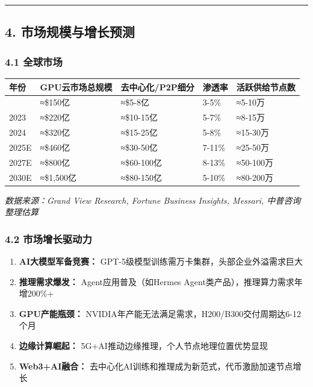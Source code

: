 \documentclass[UTF8,a4paper,12pt]{ctexart}
\begin{document}
\begin{center}\rule{0.5\linewidth}{0.5pt}\end{center}

\pagebreak

\subsection{4.
市场规模与增长预测}\label{ux5e02ux573aux89c4ux6a21ux4e0eux589eux957fux9884ux6d4b}

\subsubsection{4.1 全球市场}\label{ux5168ux7403ux5e02ux573a}

{\def\LTcaptype{none} %
\begin{longtable}[]{@{}lllll@{}}
\toprule\noalign{}
年份 & GPU云市场总规模 & 去中心化/P2P细分 & 渗透率 & 活跃供给节点数 \\
\midrule\noalign{}
\endhead
\bottomrule\noalign{}
\endlastfoot
2022 & ≈\$150亿 & ≈\$5-8亿 & 3-5\% & ≈5-10万 \\
2023 & ≈\$220亿 & ≈\$10-15亿 & 5-7\% & ≈8-15万 \\
2024 & ≈\$320亿 & ≈\$15-25亿 & 5-8\% & ≈15-30万 \\
2025E & ≈\$460亿 & ≈\$30-50亿 & 7-11\% & ≈25-50万 \\
2027E & ≈\$800亿 & ≈\$60-100亿 & 8-13\% & ≈50-100万 \\
2030E & ≈\$1,500亿 & ≈\$80-150亿 & 5-10\% & ≈80-200万 \\
\end{longtable}
}

\emph{数据来源：Grand View Research, Fortune Business Insights, Messari,
中普咨询整理估算}

\subsubsection{4.2
市场增长驱动力}\label{ux5e02ux573aux589eux957fux9a71ux52a8ux529b}

\begin{enumerate}
\def\labelenumi{\arabic{enumi}.}
\tightlist
\item
  \textbf{AI大模型军备竞赛：}
  GPT-5级模型训练需万卡集群，头部企业外溢需求巨大
\item
  \textbf{推理需求爆发：} Agent应用普及（如Hermes
  Agent类产品），推理算力需求年增200\%+
\item
  \textbf{GPU产能瓶颈：}
  NVIDIA年产能无法满足需求，H200/B300交付周期达6-12个月
\item
  \textbf{边缘计算崛起：} 5G+AI推动边缘推理，个人节点地理位置优势显现
\item
  \textbf{Web3+AI融合：}
  去中心化AI训练和推理成为新范式，代币激励加速节点增长
\end{enumerate}
\end{document}
